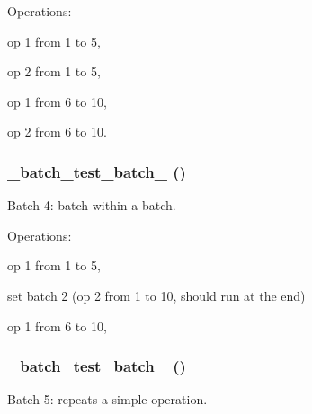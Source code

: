 Operations:
\begin{DoxyItemize}
\item op 1 from 1 to 5,
\item op 2 from 1 to 5,
\item op 1 from 6 to 10,
\item op 2 from 6 to 10. 
\end{DoxyItemize}\hypertarget{batch__test_8module_acf897bcbd95ae9e8d37257f91c74ce03}{
\subsubsection[{\_\-batch\_\-test\_\-batch\_\-4}]{\setlength{\rightskip}{0pt plus 5cm}\_\-batch\_\-test\_\-batch\_ ()}}
\label{batch__test_8module_acf897bcbd95ae9e8d37257f91c74ce03}
Batch 4: batch within a batch.

Operations:
\begin{DoxyItemize}
\item op 1 from 1 to 5,
\item set batch 2 (op 2 from 1 to 10, should run at the end)
\item op 1 from 6 to 10, 
\end{DoxyItemize}\hypertarget{batch__test_8module_ac0b804aae71b8e81c340afe5543f380f}{
\subsubsection[{\_\-batch\_\-test\_\-batch\_\-5}]{\setlength{\rightskip}{0pt plus 5cm}\_\-batch\_\-test\_\-batch\_ ()}}
\label{batch__test_8module_ac0b804aae71b8e81c340afe5543f380f}
Batch 5: repeats a simple operation.

